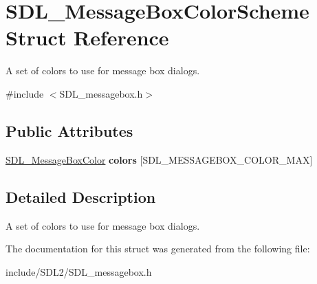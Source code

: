 \hypertarget{struct_s_d_l___message_box_color_scheme}{}\section{S\+D\+L\+\_\+\+Message\+Box\+Color\+Scheme Struct Reference}
\label{struct_s_d_l___message_box_color_scheme}


A set of colors to use for message box dialogs.  




{\ttfamily \#include $<$S\+D\+L\+\_\+messagebox.\+h$>$}

\subsection*{Public Attributes}
\begin{DoxyCompactItemize}
\item 
\mbox{\label{struct_s_d_l___message_box_color_scheme_ae3712ec81e41b63b781b7d49d3b3b8f6}} 
\hyperlink{struct_s_d_l___message_box_color}{S\+D\+L\+\_\+\+Message\+Box\+Color} {\bfseries colors} \mbox{[}S\+D\+L\+\_\+\+M\+E\+S\+S\+A\+G\+E\+B\+O\+X\+\_\+\+C\+O\+L\+O\+R\+\_\+\+M\+AX\mbox{]}
\end{DoxyCompactItemize}


\subsection{Detailed Description}
A set of colors to use for message box dialogs. 

The documentation for this struct was generated from the following file\+:\begin{DoxyCompactItemize}
\item 
include/\+S\+D\+L2/S\+D\+L\+\_\+messagebox.\+h\end{DoxyCompactItemize}
